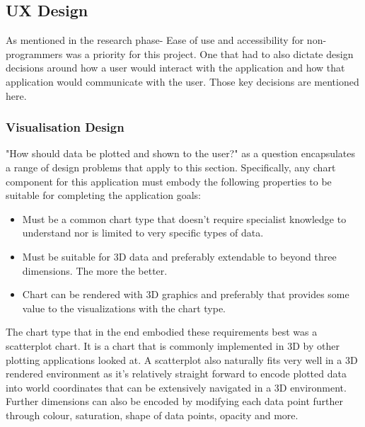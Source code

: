 \subsection{UX Design} \label{uxdesign}

As mentioned in the research phase- Ease of use and accessibility for non-programmers was a priority for this project. One that had to also dictate design decisions around how a user would interact with the application and how that application would communicate with the user. Those key decisions are mentioned here.

\subsubsection{Visualisation Design}
"How should data be plotted and shown to the user?" as a question encapsulates a range of design problems that apply to this section. Specifically, any chart component for this application must embody the following properties to be suitable for completing the application goals:
\begin{itemize}
    \item Must be a common chart type that doesn't require specialist knowledge to understand nor is limited to very specific types of data.
    \item Must be suitable for 3D data and preferably extendable to beyond three dimensions. The more the better.
    \item Chart can be rendered with 3D graphics and preferably that provides some value to the visualizations with the chart type.
\end{itemize}

The chart type that in the end embodied these requirements best was a scatterplot chart. It is a chart that is commonly implemented in 3D by other plotting applications looked at. A scatterplot also naturally fits very well in a 3D rendered environment as it's relatively straight forward to encode plotted data into world coordinates that can be extensively navigated in a 3D environment. Further dimensions can also be encoded by modifying each data point further through colour, saturation, shape of data points, opacity and more.

